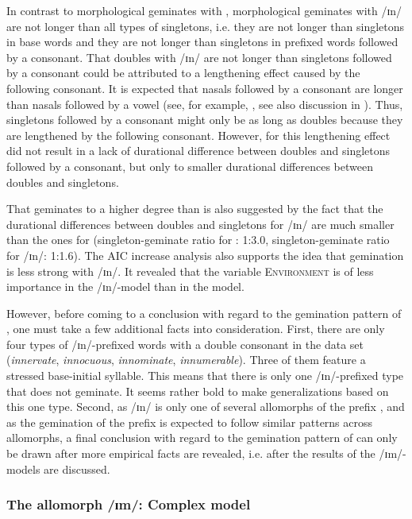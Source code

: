 In contrast to morphological geminates with , 
morphological geminates with /ɪn/ are not longer than all types of singletons, i.e. they are not longer than singletons in base words and they are not longer than singletons in prefixed words followed by a consonant. 
That doubles with /ɪn/ are not longer than singletons followed by a consonant could be attributed to a lengthening effect caused by the following consonant.
It is expected that nasals followed by a consonant are longer than nasals followed by a vowel (see, for example, \citealt{Umeda.1977}, see also discussion in ).  Thus, singletons followed by a consonant might only be as long as doubles because they are lengthened by the following consonant. However, for  this lengthening effect did not result in a lack of durational difference between doubles and singletons followed by a consonant, but only to smaller durational differences between doubles and singletons.  

That  geminates to a higher degree than  is also suggested by the fact that the durational differences between doubles and singletons for /ɪn/ are much smaller than the ones for  (singleton-geminate ratio for : 1:3.0, singleton-geminate ratio for /ɪn/: 1:1.6). 
The AIC increase analysis also supports the idea that gemination is less strong with /ɪn/. It revealed that the variable \textsc{Environment} is of less importance in the /ɪn/-model than in the model.




However, before coming to a conclusion with regard to the gemination pattern of , one must take a few additional facts into consideration. 
First, there are only four types of /ɪn/-prefixed words with a double consonant in the data set (\textit{innervate}, \textit{innocuous}, \textit{innominate}, \textit{innumerable}). Three of them feature a stressed base-initial syllable. This means that there is only one /ɪn/-prefixed type that does not geminate. It seems rather bold to make generalizations based on this one type. 
Second, as /ɪn/ is only one of several allomorphs of the prefix , and as the gemination of the prefix  is expected to follow similar patterns across allomorphs, 
a final conclusion with regard to the gemination pattern of  can only be drawn after more empirical facts are revealed, i.e. after the results of the /ɪm/-models are discussed.
%


\subsubsection{The allomorph /ɪm/: Complex model}


